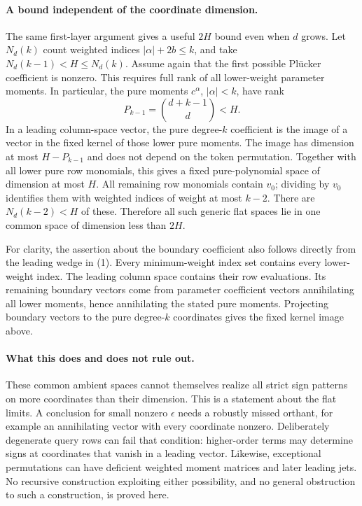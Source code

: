 \documentclass[11pt]{article}
\begin{document}
\paragraph{A bound independent of the coordinate dimension.}
The same first-layer argument gives a useful $2H$ bound even when
$d$ grows. Let $N_d(k)$ count weighted indices
$|\alpha|+2b\leq k$, and take
$N_d(k-1)<H\leq N_d(k)$. Assume again that the first possible
Pl\"ucker coefficient is nonzero. This requires full rank of all
lower-weight parameter moments. In particular, the pure moments
$c^\alpha$, $|\alpha|<k$, have rank
\[
 P_{k-1}=\binom{d+k-1}{d}<H.
\]
In a leading column-space vector, the pure degree-$k$ coefficient
is the image of a vector in the fixed kernel of those lower pure
moments. The image has dimension at most $H-P_{k-1}$ and does not
depend on the token permutation. Together with all lower pure row
monomials, this gives a fixed pure-polynomial space of dimension at
most $H$. All remaining row monomials contain $v_0$; dividing by
$v_0$ identifies them with weighted indices of weight at most $k-2$.
There are $N_d(k-2)<H$ of these. Therefore all such generic flat
spaces lie in one common space of dimension less than $2H$.

For clarity, the assertion about the boundary coefficient also follows
directly from the leading wedge in (1). Every minimum-weight index set
contains every lower-weight index. The leading column space contains
their row evaluations. Its remaining boundary vectors come from
parameter coefficient vectors annihilating all lower moments, hence
annihilating the stated pure moments. Projecting boundary vectors to
the pure degree-$k$ coordinates gives the fixed kernel image above.

\paragraph{What this does and does not rule out.}
These common ambient spaces cannot themselves realize all strict sign
patterns on more coordinates than their dimension. This is a statement
about the flat limits. A conclusion for small nonzero $\epsilon$ needs
a robustly missed orthant, for example an annihilating vector with
every coordinate nonzero. Deliberately degenerate query rows can fail
that condition: higher-order terms may determine signs at coordinates
that vanish in a leading vector. Likewise, exceptional permutations
can have deficient weighted moment matrices and later leading jets.
No recursive construction exploiting either possibility, and no
general obstruction to such a construction, is proved here.
\end{document}
